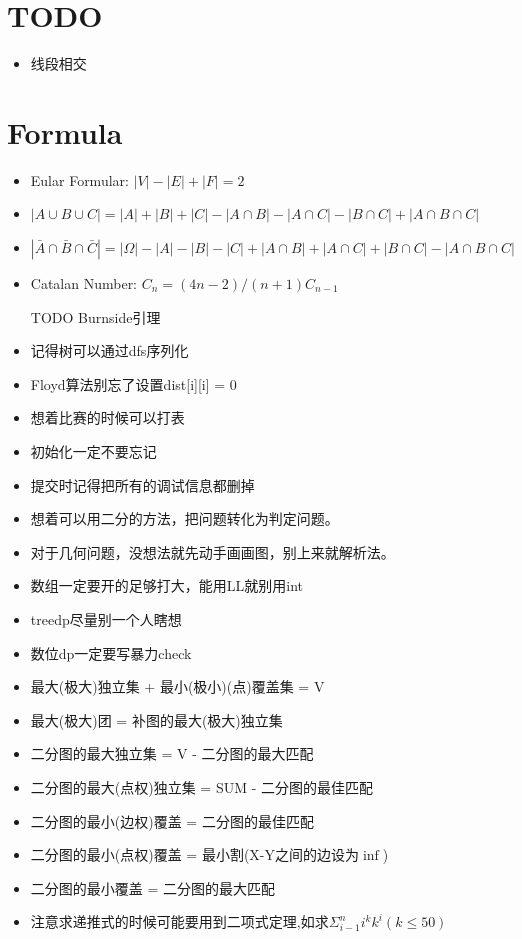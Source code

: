 \documentclass[
	10pt,
	twocolumn,
	a4paper,
]{article}
\begin{document}
\section{TODO}
\begin{itemize}
\item 线段相交
\end{itemize}
\section{Formula}
\begin{itemize} 
\setlength{\itemsep}{0pt}
\item Eular Formular: $|V| - |E| + |F| = 2$
\item $|A \cup B \cup C | = |A| + |B| + |C| - |A \cap B| - |A \cap C| - |B \cap C| + |A \cap B \cap C|$
\item $|\bar A \cap \bar B \cap \bar C | = |\Omega| - |A| - |B| - |C| + |A \cap B| + |A \cap C| + |B \cap C| - |A \cap B \cap C| $
\item Catalan Number: $C_n = (4n-2) / (n+1) C_{n-1}$
\item [TODO]Burnside引理
\item 记得树可以通过dfs序列化
\item Floyd算法别忘了设置dist[i][i] = 0
\item 想着比赛的时候可以打表
\item 初始化一定不要忘记
\item 提交时记得把所有的调试信息都删掉
\item 想着可以用二分的方法，把问题转化为判定问题。
\item 对于几何问题，没想法就先动手画画图，别上来就解析法。
\item 数组一定要开的足够打大，能用LL就别用int
\item treedp尽量别一个人瞎想
\item 数位dp一定要写暴力check
\item 最大(极大)独立集 + 最小(极小)(点)覆盖集 = V
\item 最大(极大)团 = 补图的最大(极大)独立集
\item 二分图的最大独立集 = V - 二分图的最大匹配
\item 二分图的最大(点权)独立集 = SUM - 二分图的最佳匹配
\item 二分图的最小(边权)覆盖 = 二分图的最佳匹配
\item 二分图的最小(点权)覆盖 = 最小割(X-Y之间的边设为$\inf$)
\item 二分图的最小覆盖 = 二分图的最大匹配
\item 注意求递推式的时候可能要用到二项式定理,如求$ \Sigma_{i-1}^n{i^k k^i} (k \le 50) $
\end{itemize} 
\end{document}
